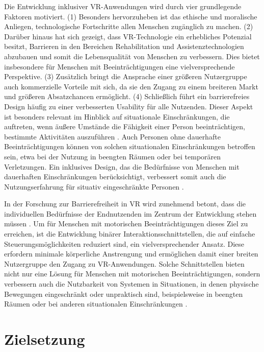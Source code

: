 Die Entwicklung inklusiver VR-Anwendungen wird durch vier grundlegende Faktoren motiviert. (1) Besonders hervorzuheben ist das ethische und moralische Anliegen, technologische Fortschritte allen Menschen zugänglich zu machen. (2) Darüber hinaus hat sich gezeigt, dass VR-Technologie ein erhebliches Potenzial besitzt, Barrieren in den Bereichen Rehabilitation und Assistenztechnologien abzubauen und somit die Lebensqualität von Menschen zu verbessern. Dies bietet insbesondere für Menschen mit Beeinträchtigungen eine vielversprechende Perspektive. (3) Zusätzlich bringt die Ansprache einer größeren Nutzergruppe auch kommerzielle Vorteile mit sich, da sie den Zugang zu einem breiteren Markt und größeren Absatzchancen ermöglicht. (4) Schließlich führt ein barrierefreies Design häufig zu einer verbesserten Usability für alle Nutzenden. Dieser Aspekt ist besonders relevant im Hinblick auf situationale Einschränkungen, die auftreten, wenn äußere Umstände die Fähigkeit einer Person beeinträchtigen, bestimmte Aktivitäten auszuführen \citep{10.1145/1952383.1952384}. Auch Personen ohne dauerhafte Beeinträchtigungen können von solchen situationalen Einschränkungen betroffen sein, etwa bei der Nutzung in beengten Räumen oder bei temporären Verletzungen. Ein inklusives Design, das die Bedürfnisse von Menschen mit dauerhaften Einschränkungen berücksichtigt, verbessert somit auch die Nutzungserfahrung für situativ eingeschränkte Personen \citep{dudley_inclusive_2023}.

In der Forschung zur Barrierefreiheit in VR wird zunehmend betont, dass die individuellen Bedürfnisse der Endnutzenden im Zentrum der Entwicklung stehen müssen \citep{dombrowski_designing_2019}. Um für Menschen mit motorischen Beeinträchtigungen dieses Ziel zu erreichen, ist die Entwicklung binärer Interaktionsschnittstellen, die auf einfache Steuerungsmöglichkeiten reduziert sind, ein vielversprechender Ansatz.
Diese erfordern minimale körperliche Anstrengung und ermöglichen damit einer breiten Nutzergruppe den Zugang zu VR-Anwendungen. Solche Schnittstellen bieten nicht nur eine Lösung für Menschen mit motorischen Beeinträchtigungen, sondern verbessern auch die Nutzbarkeit von Systemen in Situationen, in denen physische Bewegungen eingeschränkt oder unpraktisch sind, beispielsweise in beengten Räumen oder bei anderen situationalen Einschränkungen \citep{10.1145/1952383.1952384}.

\section{Zielsetzung}

